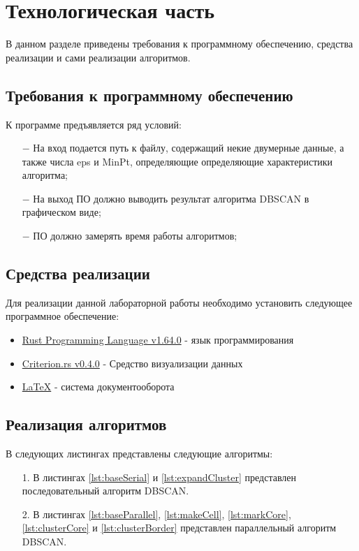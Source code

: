 \chapter{Технологическая часть}

В данном разделе приведены требования к программному обеспечению, средства реализации и сами реализации алгоритмов.

\section{Требования к программному обеспечению}
К программе предъявляется ряд условий:
\begin{itemize}
    \item[$-$] На вход подается путь к файлу, содержащий некие двумерные данные, а также числа eps и MinPt, определяющие определяющие характеристики алгоритма;
    \item[$-$] На выход ПО должно выводить результат алгоритма DBSCAN в графическом виде;
    \item[$-$] ПО должно замерять время работы алгоритмов;
\end{itemize}

\section{Средства реализации}
Для реализации данной лабораторной работы необходимо установить следующее программное обеспечение:
\begin{itemize}
    \item \href{https://www.rust-lang.org/}{Rust Programming Language v1.64.0} - язык программирования
    \item \href{https://github.com/bheisler/criterion.rs}{Criterion.rs v0.4.0} - Средство визуализации данных
    \item \href{https://www.latex-project.org/}{LaTeX} - система документооборота
\end{itemize}

\section{Реализация алгоритмов}
В следующих листингах представлены следующие алгоритмы:
\begin{itemize}
    \item[1.] В листингах \ref{lst:baseSerial} и \ref{lst:expandCluster} представлен последовательный алгоритм DBSCAN.
    \item[2.] В листингах \ref{lst:baseParallel}, \ref{lst:makeCell}, \ref{lst:markCore}, \ref{lst:clusterCore} и \ref{lst:clusterBorder} представлен параллельный алгоритм DBSCAN.
\end{itemize}
\newpage

